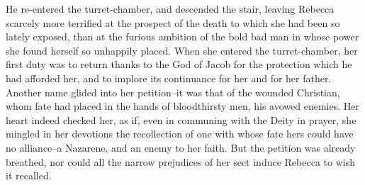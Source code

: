 He re-entered the turret-chamber, and descended the stair, leaving
Rebecca scarcely more terrified at the prospect of the death to which
she had been so lately exposed, than at the furious ambition of the bold
bad man in whose power she found herself so unhappily placed. When she
entered the turret-chamber, her first duty was to return thanks to the
God of Jacob for the protection which he had afforded her, and to
implore its continuance for her and for her father. Another name glided
into her petition--it was that of the wounded Christian, whom fate had
placed in the hands of bloodthirsty men, his avowed enemies. Her heart
indeed checked her, as if, even in communing with the Deity in prayer,
she mingled in her devotions the recollection of one with whose fate
hers could have no alliance--a Nazarene, and an enemy to her faith. But
the petition was already breathed, nor could all the narrow prejudices
of her sect induce Rebecca to wish it recalled.
